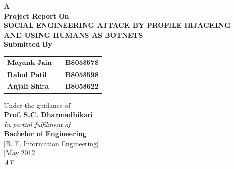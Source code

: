 
\newpage


\begin{center}
\thispagestyle{empty}


\Large{\textbf{A\\Project Report On}}\\[0.7cm]
\Large{\textsc {\textbf{SOCIAL ENGINEERING ATTACK BY PROFILE HIJACKING
AND USING HUMANS AS BOTNETS}}}\\[0.5cm]
\Large{\textbf{Submitted By}}\\[0.5cm]
\begin{table}[h]
\centering
\begin{tabular}{>{\bfseries}lc>{\bfseries}r}
Mayank Jain & & B8058578\\ %
Rahul Patil & & B8058598\\ %
Anjali Shira & & B8058622\\ %
\end{tabular}
\end{table}
\large{Under the guidance of}\\[0.5cm]
\Large{\textbf{Prof. S.C. Dharmadhikari}}\\[0.4cm]
\large{\emph{In partial fulfilment of}}\\
\LARGE{\textbf{Bachelor of Engineering}}\\
\LARGE{{[}B. E. Information Engineering{]}}\\[0.5cm]
\LARGE{{[}May 2012{]}}\\
\Large{\emph{AT}}\\[0.2cm]




\end{center}
